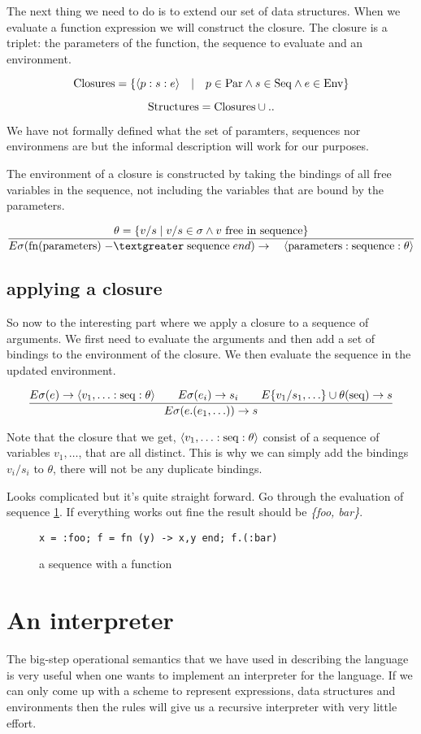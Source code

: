 \documentclass[a4paper,11pt]{article}
\begin{document}
The next thing we need to do is to extend our set of data
structures. When we evaluate a function expression we will construct
the closure. The closure is a triplet: the parameters of the function,
the sequence to evaluate and an environment.

$${\rm Closures} = \{\langle p:s:e \rangle \quad | \quad p \in {\rm Par} \wedge s \in {\rm Seq} \wedge e \in {\rm Env}\}$$

$${\rm Structures} = {\rm Closures} \cup ..$$

We have not formally defined what the set of paramters, sequences nor
environmens are but the informal description will work for our
purposes.

The environment of a closure is constructed by taking the bindings of
all free variables in the sequence, not including the variables that
are bound by the parameters.

$$\frac{ \theta = \{ v/s \mid  v/s \in \sigma \wedge v {\rm\ free\  in\ sequence}\}}{
E\sigma({\rm fn}({\rm parameters})\; {\rm -\textgreater}\; {\rm sequence}\; end )\rightarrow \quad \langle{\rm parameters}:{\rm sequence}:\theta\rangle}$$

\subsection{applying a closure}

So now to the interesting part where we apply a closure to a sequence
of arguments. We first need to evaluate the arguments and then add a
set of bindings to the environment of the closure. We then evaluate
the sequence in the updated environment.

$$\frac{E\sigma(e) \rightarrow \langle v_1, \ldots:{\rm seq}:\theta \rangle \qquad E\sigma(e_i) \rightarrow s_i \qquad E\{v_1/s_1, \ldots\}\cup\theta({\rm seq}) \rightarrow s}{E\sigma(e.(e_1, \ldots)) \rightarrow s}$$ 

Note that the closure that we get, $\langle v_1, \ldots:{\rm seq}:\theta \rangle$
consist of a sequence of variables $v_1, \ldots$, that are all
distinct. This is why we can simply add the bindings $v_i/s_i$ to
$\theta$, there will not be any duplicate bindings.

Looks complicated but it's quite straight forward. Go through the
evaluation of sequence \ref{fig:seq2}. If everything works out fine
the result should be {\em \{foo, bar\}}.

\begin{figure}[ht]
\center
{\tt x = :foo; f = fn (y) -> {x,y} end;  f.(:bar)}
\caption{a sequence with a function}
\label{fig:seq2}
\end{figure}

\section{An interpreter}

The big-step operational semantics that we have used in describing the
language is very useful when one wants to implement an interpreter
for the language. If we can only come up with a scheme to represent
expressions, data structures and environments then the rules will give
us a recursive interpreter with very little effort.
\end{document}
